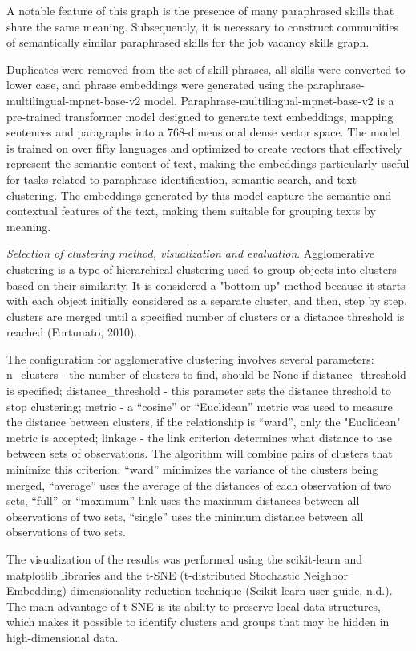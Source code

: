 \begin{multicols}{2}
A notable feature of this graph is the presence of many paraphrased
skills that share the same meaning. Subsequently, it is necessary to
construct communities of semantically similar paraphrased skills for the
job vacancy skills graph.

Duplicates were removed from the set of skill phrases, all skills were
converted to lower case, and phrase embeddings were generated using the
paraphrase-multilingual-mpnet-base-v2 model.
Paraphrase-multilingual-mpnet-base-v2 is a pre-trained transformer model
designed to generate text embeddings, mapping sentences and paragraphs
into a 768-dimensional dense vector space. The model is trained on over
fifty languages and optimized to create vectors that effectively
represent the semantic content of text, making the embeddings
particularly useful for tasks related to paraphrase identification,
semantic search, and text clustering. The embeddings generated by this
model capture the semantic and contextual features of the text, making
them suitable for grouping texts by meaning.

\emph{Selection of clustering method, visualization and evaluation}.
Agglomerative clustering is a type of hierarchical clustering used to
group objects into clusters based on their similarity. It is considered
a "bottom-up" method because it starts with each object initially
considered as a separate cluster, and then, step by step, clusters are
merged until a specified number of clusters or a distance threshold is
reached (Fortunato, 2010).

The configuration for agglomerative clustering involves several
parameters: n\_clusters - the number of clusters to find, should be None
if distance\_threshold is specified; distance\_threshold - this
parameter sets the distance threshold to stop clustering; metric - a
``cosine'' or ``Euclidean'' metric was used to measure the distance
between clusters, if the relationship is ``ward'', only the "Euclidean"
metric is accepted; linkage - the link criterion determines what
distance to use between sets of observations. The algorithm will combine
pairs of clusters that minimize this criterion: ``ward'' minimizes the
variance of the clusters being merged, ``average'' uses the average of
the distances of each observation of two sets, ``full'' or ``maximum''
link uses the maximum distances between all observations of two sets,
``single'' uses the minimum distance between all observations of two
sets.

The visualization of the results was performed using the scikit-learn
and matplotlib libraries and the t-SNE (t-distributed Stochastic
Neighbor Embedding) dimensionality reduction technique (Scikit-learn
user guide, n.d.). The main advantage of t-SNE is its ability to
preserve local data structures, which makes it possible to identify
clusters and groups that may be hidden in high-dimensional data.


\end{multicols}

